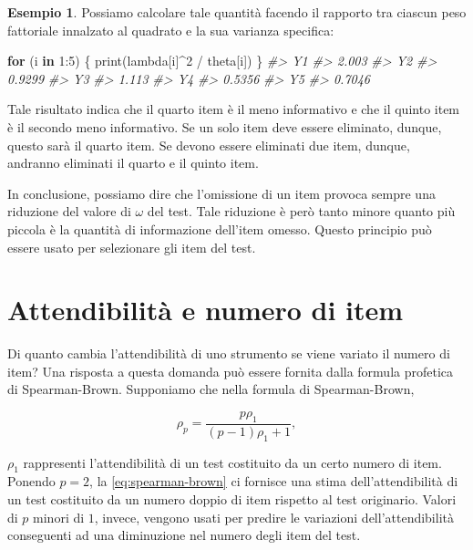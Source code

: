 \documentclass[
  11pt,
]{krantz}
\makeatletter
\newenvironment{Shaded}{\begin{snugshade}}{\end{snugshade}}
\newcommand{\CommentTok}[1]{\textcolor[rgb]{0.37,0.37,0.37}{\textit{#1}}}
\newcommand{\ControlFlowTok}[1]{\textcolor[rgb]{0.27,0.27,0.27}{\textbf{#1}}}
\newcommand{\DecValTok}[1]{\textcolor[rgb]{0.06,0.06,0.06}{#1}}
\newcommand{\FunctionTok}[1]{\textcolor[rgb]{0,0,0}{#1}}
\newcommand{\NormalTok}[1]{#1}
\newcommand{\SpecialCharTok}[1]{\textcolor[rgb]{0,0,0}{#1}}
\newenvironment{kframe}{%
\medskip{}
\setlength{\fboxsep}{.8em}
 \def\at@end@of@kframe{}%
 \ifinner\ifhmode%
  \def\at@end@of@kframe{\end{minipage}}%
  \begin{minipage}{\columnwidth}%
 \fi\fi%
 \def\FrameCommand##1{\hskip\@totalleftmargin \hskip-\fboxsep
 \colorbox{shadecolor}{##1}\hskip-\fboxsep
     \hskip-\linewidth \hskip-\@totalleftmargin \hskip\columnwidth}%
 \MakeFramed {\advance\hsize-\width
   \@totalleftmargin\z@ \linewidth\hsize
   \@setminipage}}%
 {\par\unskip\endMakeFramed%
 \at@end@of@kframe}
\renewenvironment{Shaded}{\begin{kframe}}{\end{kframe}}
\theoremstyle{definition}
\theoremstyle{definition}
\newtheorem{example}{Esempio}[chapter]
\theoremstyle{definition}
\theoremstyle{definition}
\theoremstyle{remark}
\makeatother
\begin{document}
\begin{example}
Possiamo calcolare tale quantità facendo il rapporto tra ciascun peso fattoriale innalzato al quadrato e la sua varianza specifica:

\begin{Shaded}
\begin{Highlighting}[]
\ControlFlowTok{for}\NormalTok{ (i }\ControlFlowTok{in} \DecValTok{1}\SpecialCharTok{:}\DecValTok{5}\NormalTok{) \{}
  \FunctionTok{print}\NormalTok{(lambda[i]}\SpecialCharTok{\^{}}\DecValTok{2} \SpecialCharTok{/}\NormalTok{ theta[i])}
\NormalTok{\}}
\CommentTok{\#\textgreater{}    Y1 }
\CommentTok{\#\textgreater{} 2.003 }
\CommentTok{\#\textgreater{}     Y2 }
\CommentTok{\#\textgreater{} 0.9299 }
\CommentTok{\#\textgreater{}    Y3 }
\CommentTok{\#\textgreater{} 1.113 }
\CommentTok{\#\textgreater{}     Y4 }
\CommentTok{\#\textgreater{} 0.5356 }
\CommentTok{\#\textgreater{}     Y5 }
\CommentTok{\#\textgreater{} 0.7046}
\end{Highlighting}
\end{Shaded}

Tale risultato indica che il quarto item è il meno informativo e che il quinto item è il secondo meno informativo. Se un solo item deve essere eliminato, dunque, questo sarà il quarto item. Se devono essere eliminati due item, dunque, andranno eliminati il quarto e il quinto item.
\end{example}

In conclusione, possiamo dire che l'omissione di un item provoca sempre una riduzione del valore di \(\omega\) del test. Tale riduzione è però tanto minore quanto più piccola è la quantità di informazione dell'item omesso. Questo principio può essere usato per selezionare gli item del test.

\hypertarget{sec:reliability_number_item}{%
\section{Attendibilità e numero di item}\label{sec:reliability_number_item}}

Di quanto cambia l'attendibilità di uno strumento se viene variato il numero di item? Una risposta a questa domanda può essere fornita dalla formula profetica di Spearman-Brown. Supponiamo che nella formula di Spearman-Brown,

\begin{equation}
  \rho_p = \frac{p \rho_1}{(p-1)\rho_1 + 1},
  \label{eq:spearman-brown}
\end{equation}

\(\rho_1\) rappresenti l'attendibilità di un test costituito da un certo numero di item. Ponendo \(p=2\), la \eqref{eq:spearman-brown} ci fornisce una stima dell'attendibilità di un test costituito da un numero doppio di item rispetto al test originario. Valori di \(p\) minori di \(1\), invece, vengono usati per predire le variazioni dell'attendibilità conseguenti ad una diminuzione nel numero degli item del test.
\end{document}
